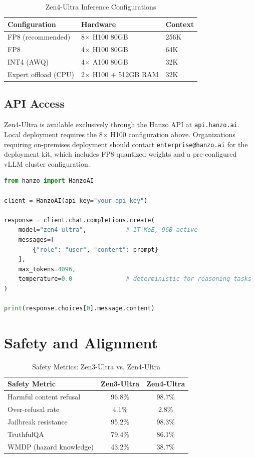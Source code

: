 \documentclass[11pt,a4paper]{article}
\begin{document}
\begin{table}[H]
\centering
\begin{tabular}{lll}
\toprule
\textbf{Configuration} & \textbf{Hardware} & \textbf{Context} \\
\midrule
FP8 (recommended)      & 8$\times$ H100 80GB    & 256K \\
FP8                    & 4$\times$ H100 80GB    & 64K  \\
INT4 (AWQ)             & 4$\times$ A100 80GB    & 32K  \\
Expert offload (CPU)   & 2$\times$ H100 + 512GB RAM & 32K \\
\bottomrule
\end{tabular}
\caption{Zen4-Ultra Inference Configurations}
\end{table}

\subsection{API Access}

Zen4-Ultra is available exclusively through the Hanzo API at \texttt{api.hanzo.ai}. Local
deployment requires the 8$\times$ H100 configuration above. Organizations requiring
on-premises deployment should contact \texttt{enterprise@hanzo.ai} for the deployment kit,
which includes FP8-quantized weights and a pre-configured vLLM cluster configuration.

\begin{lstlisting}[language=Python, caption=Zen4-Ultra API Request]
from hanzo import HanzoAI

client = HanzoAI(api_key="your-api-key")

response = client.chat.completions.create(
    model="zen4-ultra",           # 1T MoE, 96B active
    messages=[
        {"role": "user", "content": prompt}
    ],
    max_tokens=4096,
    temperature=0.0               # deterministic for reasoning tasks
)

print(response.choices[0].message.content)
\end{lstlisting}

\section{Safety and Alignment}

\begin{table}[H]
\centering
\begin{tabular}{lcc}
\toprule
\textbf{Safety Metric} & \textbf{Zen3-Ultra} & \textbf{Zen4-Ultra} \\
\midrule
Harmful content refusal        & 96.8\% & 98.7\% \\
Over-refusal rate              & 4.1\%  & 2.8\%  \\
Jailbreak resistance           & 95.2\% & 98.3\% \\
TruthfulQA                     & 79.4\% & 86.1\% \\
WMDP (hazard knowledge)        & 43.2\% & 38.7\% \\
\bottomrule
\end{tabular}
\caption{Safety Metrics: Zen3-Ultra vs. Zen4-Ultra}
\end{table}
\end{document}

